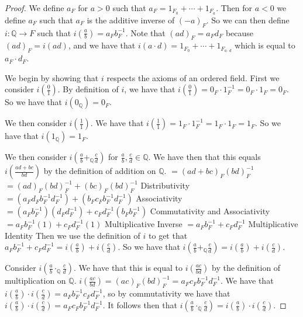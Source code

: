 \documentclass[12pt]{article}
\newcommand{\bbQ}{\mathbb{Q}}
\newcommand{\fr}[2]{\frac{\underline{#1}}{#2}}
\renewcommand{\_}[1]{\underline{ #1 }}
\theoremstyle{definition}
\numberwithin{equation}{subsection}
\begin{document}
\begin{proof}
We define $a_F$ for $a > 0$ such that $a_F = 1_{F_0} + \dotsm + 1_{F_a}$. Then for $a < 0$ we define $a_F$ such that $a_F$ is the additive inverse of $(-a)_F$. So we can then define $i : \bbQ \to F$ such that $i(\fr{a}{b}) = a_Fb_F^{-1}$. Note that $(ad)_F = a_Fd_F$ because $(ad)_F = i(ad)$, and we have that $i(a \cdot d) = 1_{F_0} + \dotsm + 1_{F_{a \cdot d}}$ which is equal to $a_F \cdot d_F$. \newline

We begin by showing that $i$ respects the axioms of an ordered field. First we consider $i(\fr{0}{1})$. By definition of $i$, we have that $i(\fr{0}{1}) = 0_F \cdot 1^{-1}_F = 0_F \cdot 1_F = 0_F$. So we have that $i(0_\bbQ)=0_F$. \newline

We then consider $i(\fr{1}{1})$. We have that $i(\fr{1}{1}) = 1_F \cdot 1^{-1}_F = 1_F \cdot 1_F = 1_F$. So we have that $i(1_\bbQ) = 1_F$.
\newline

We then consider $i(\fr{a}{b} +_\bbQ \fr{c}{d})$ for $\fr{a}{b}, \fr{c}{d} \in \bbQ$. We have then that this equals $i(\fr{ad + bc}{bd})$ by the definition of addition on $\bbQ$. \newline
$= (ad + bc)_F(bd)^{-1}_F$ \newline
$= (ad)_F(bd)^{-1}_F + (bc)_F(bd)_F^{-1}$ Distributivity \newline
$= (a_Fd_Fb^{-1}_Fd^{-1}_F) + (b_Fc_Fb_F^{-1}d_F^{-1})$ Associativity \newline
$= (a_Fb^{-1}_F)(d_Fd_F^{-1})+c_Fd_F^{-1}(b_Fb_F^{-1})$ Commutativity and Associativity \newline
$= a_Fb_F^{-1}(1) + c_Fd_F^{-1}(1)$ Multiplicative Inverse \newline
$= a_Fb_F^{-1} + c_Fd_F^{-1}$ Multiplicative Identity \newline 
Then we use the definition of $i$ to get that $a_Fb_F^{-1} + c_Fd_F^{-1} = i(\fr{a}{b}) + i(\fr{c}{d})$. So we have that $i(\fr{a}{b} +_\bbQ \fr{c}{d}) =  i(\fr{a}{b}) + i(\fr{c}{d})$. \newline

Consider $i(\fr{a}{b} \cdot_\bbQ \fr{c}{d})$. We have that this is equal to $i(\fr{ac}{bd})$ by the definition of multiplication on $\bbQ$. $i(\fr{ac}{bd}) = (ac)_F(bd)^{-1}_F = a_Fc_Fb_F^{-1}d_F^{-1}$. We have that $i(\fr{a}{b}) \cdot i(\fr{c}{d}) = a_Fb_F^{-1}c_Fd_F^{-1}$, so by commutativity we have that $i(\fr{a}{b}) \cdot i(\fr{c}{d}) = a_Fc_Fb_F^{-1}d_F^{-1}$. It follows then that $i(\fr{a}{b} \cdot_\bbQ \fr{c}{d}) = i(\fr{a}{b}) \cdot i(\fr{c}{d})$. \newline


\end{proof}
\end{document}
